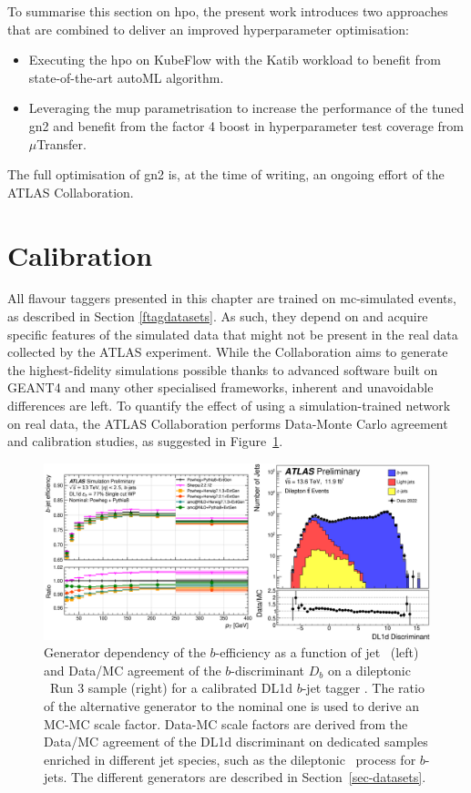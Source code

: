 To summarise this section on \gls{hpo}, the present work introduces two approaches that are combined to deliver an improved hyperparameter optimisation:
\begin{itemize}
  \item Executing the \gls{hpo} on KubeFlow with the Katib workload to benefit from state-of-the-art autoML algorithm.
  \item Leveraging the \gls{mup} parametrisation to increase the performance of the tuned \gls{gn2} and benefit from the factor 4 boost in hyperparameter test coverage from $\mu$Transfer.
\end{itemize}
The full optimisation of \gls{gn2} is, at the time of writing, an ongoing effort of the ATLAS Collaboration.

\section{Calibration}\label{chap-calibration}
All flavour taggers presented in this chapter are trained on \gls{mc}-simulated events, as described in Section \ref{ftagdatasets}. As such, they depend on and acquire specific features of the simulated data that might not be present in the real data collected by the ATLAS experiment. While the Collaboration aims to generate the highest-fidelity simulations possible thanks to advanced software built on GEANT4 \cite{Agostinelli:602040} and many other specialised frameworks, inherent and unavoidable differences are left. To quantify the effect of using a simulation-trained network on real data, the ATLAS Collaboration performs Data-Monte Carlo agreement and calibration studies, as suggested in Figure~\ref{fig:calibFtagDL1d}.

\begin{center}
  \begin{figure}[h!]
  \centerline{
  \includegraphics[width=\textwidth]{Images/FTAG/calib/sfAg.png}
  }
  \caption{Generator dependency of the $b$-efficiency as a function of jet \pt\ (left) and Data/MC agreement of the $b$-discriminant $D_b$ on a dileptonic \ttb\ Run 3 sample (right) for a calibrated DL1d $b$-jet tagger \cite{ATL-PLOT-FTAG-2023-01}. The ratio of the alternative generator to the nominal one is used to derive an MC-MC scale factor. Data-MC scale factors are derived from the Data/MC agreement of the DL1d discriminant on dedicated samples enriched in different jet species, such as the dileptonic \ttb\ process for $b$-jets. The different generators are described in Section~\ref{sec-datasets}.}
  \label{fig:calibFtagDL1d}
  \end{figure} 
\end{center}

